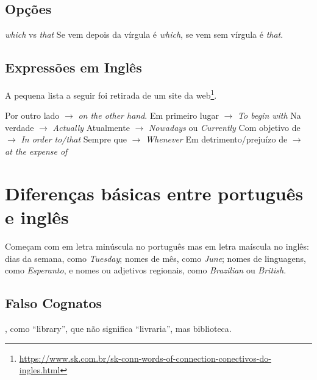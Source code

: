 \documentclass[openany]{book}
\begin{document}
\subsection{Opções}

\begin{outline}
\1 \textit{which} vs \textit{that}
\2 Se vem depois da vírgula é \textit{which}, se vem sem vírgula é \textit{that}.
\end{outline}

\subsection{Expressões em Inglês}

 A pequena lista a seguir foi retirada de um site da web\footnote{\url{https://www.sk.com.br/sk-conn-words-of-connection-conectivos-do-ingles.html}}.

\begin{outline}
    \1 Por outro lado $\rightarrow$ \textit{on the other hand}.
    \1 Em primeiro lugar $\rightarrow$ \textit{To begin with}
    \1 Na verdade    $\rightarrow$ \textit{Actually}
    \1 Atualmente    $\rightarrow$ \textit{Nowadays} ou \textit{Currently}
    \1 Com objetivo de $\rightarrow$ \textit{In order to/that}
    \1 Sempre que $\rightarrow$ \textit{Whenever}
    \1 Em detrimento/prejuízo de $\rightarrow$ \textit{at the expense of}
\end{outline}


\section{Diferenças básicas entre português e inglês}

\begin{outline}
    \1 Começam com em letra minúscula no português mas em letra maíscula no inglês:
    \2 dias da semana, como \textit{Tuesday};
    \2 nomes de mês, como \textit{June};
    \2 nomes de linguagens, como \textit{Esperanto}, e
    \2 nomes ou adjetivos regionais, como \textit{Brazilian} ou \textit{British}.
\end{outline}

\subsection{Falso Cognatos}

, como ``library'', que não significa ``livraria'', mas biblioteca.
\end{document}
